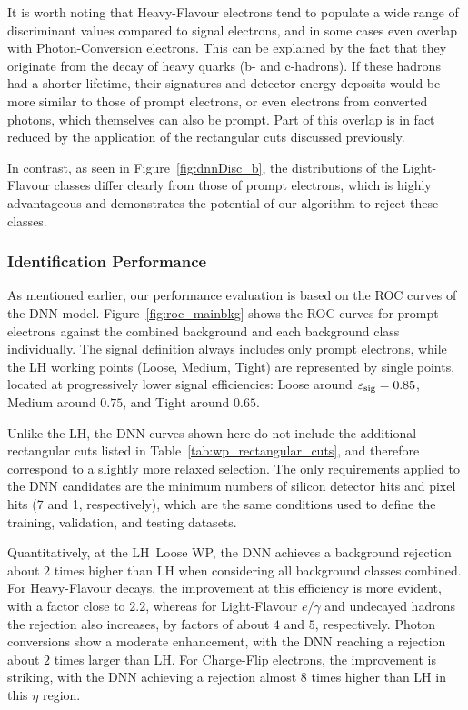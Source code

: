 It is worth noting that Heavy-Flavour electrons tend to populate a wide range of discriminant values compared to signal electrons, and in some cases even overlap with Photon-Conversion electrons. This can be explained by the fact that they originate from the decay of heavy quarks (b- and c-hadrons). If these hadrons had a shorter lifetime, their signatures and detector energy deposits would be more similar to those of prompt electrons, or even electrons from converted photons, which themselves can also be prompt. Part of this overlap is in fact reduced by the application of the rectangular cuts discussed previously.

In contrast, as seen in Figure~\ref{fig:dnnDisc_b}, the distributions of the Light-Flavour classes differ clearly from those of prompt electrons, which is highly advantageous and demonstrates the potential of our algorithm to reject these classes.

\subsubsection{Identification Performance}

As mentioned earlier, our performance evaluation is based on the ROC curves of the DNN model.
Figure~\ref{fig:roc_mainbkg} shows the ROC curves for prompt electrons against the combined background and each background class individually. The signal definition always includes only prompt electrons, while the LH working points (Loose, Medium, Tight) are represented by single points, located at progressively lower signal efficiencies: Loose around $\varepsilon_{\rm sig} = 0.85$, Medium around $0.75$, and Tight around $0.65$.

Unlike the LH, the DNN curves shown here do not include the additional rectangular cuts listed in Table~\ref{tab:wp_rectangular_cuts}, and therefore correspond to a slightly more relaxed selection. The only requirements applied to the DNN candidates are the minimum numbers of silicon detector hits and pixel hits (7 and 1, respectively), which are the same conditions used to define the training, validation, and testing datasets.

Quantitatively, at the LH~Loose WP, the DNN achieves a background rejection about $2$ times higher than LH when considering all background classes combined. For Heavy-Flavour decays, the improvement at this efficiency is more evident, with a factor close to $2.2$, whereas for Light-Flavour $e/\gamma$ and undecayed hadrons the rejection also increases, by factors of about $4$ and $5$, respectively. Photon conversions show a moderate enhancement, with the DNN reaching a rejection about $2$ times larger than LH. For Charge-Flip electrons, the improvement is striking, with the DNN achieving a rejection almost $8$ times higher than LH in this $\eta$ region.

